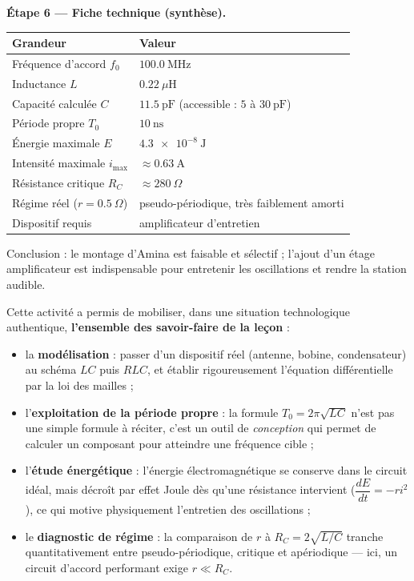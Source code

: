\documentclass[11pt]{article}
\newcounter{popsec}
\newcounter{popsub}
\newcommand{\courssub}[1]{%
  \stepcounter{popsub}%
  \par\vspace{9pt}\noindent{\popxbold\fontsize{11.5}{13}\selectfont\color{popink}{\color{poporange}\thepopsec.\thepopsub}\hspace{6pt}#1}\par\nopagebreak\vspace{4pt}
}
\begin{document}
\begin{exoresolu}
\textbf{Étape 6 — Fiche technique (synthèse).}

\begin{center}
\begin{tabularx}{\linewidth}{|l|X|}\hline
\rowcolor{popblueL} \textbf{Grandeur} & \textbf{Valeur} \\ \hline
Fréquence d'accord $f_0$ & $\num{100,0}~\text{MHz}$ \\ \hline
Inductance $L$ & $\num{0,22}~\mu\text{H}$ \\ \hline
Capacité calculée $C$ & $\num{11,5}~\text{pF}$ (accessible : $5$ à $30~\text{pF}$) \\ \hline
Période propre $T_0$ & $\num{10}~\text{ns}$ \\ \hline
Énergie maximale $E$ & $\num{4,3e-8}~\text{J}$ \\ \hline
Intensité maximale $i_{\max}$ & $\approx \num{0,63}~\text{A}$ \\ \hline
Résistance critique $R_C$ & $\approx \num{280}~\Omega$ \\ \hline
Régime réel ($r = \num{0,5}~\Omega$) & pseudo-périodique, très faiblement amorti \\ \hline
Dispositif requis & amplificateur d'entretien \\ \hline
\end{tabularx}
\end{center}

Conclusion : le montage d'Amina est faisable et sélectif ; l'ajout d'un étage amplificateur est indispensable pour entretenir les oscillations et rendre la station audible.
\end{exoresolu}

\courssub{Bilan de l'activité}

Cette activité a permis de mobiliser, dans une situation technologique authentique, \textbf{l'ensemble des savoir-faire de la leçon} :
\begin{itemize}
\item la \textbf{modélisation} : passer d'un dispositif réel (antenne, bobine, condensateur) au schéma $LC$ puis $RLC$, et établir rigoureusement l'équation différentielle par la loi des mailles ;
\item l'\textbf{exploitation de la période propre} : la formule $T_0 = 2\pi\sqrt{LC}$ n'est pas une simple formule à réciter, c'est un outil de \emph{conception} qui permet de calculer un composant pour atteindre une fréquence cible ;
\item l'\textbf{étude énergétique} : l'énergie électromagnétique se conserve dans le circuit idéal, mais décroît par effet Joule dès qu'une résistance intervient ($\dfrac{dE}{dt} = -ri^2$), ce qui motive physiquement l'entretien des oscillations ;
\item le \textbf{diagnostic de régime} : la comparaison de $r$ à $R_C = 2\sqrt{L/C}$ tranche quantitativement entre pseudo-périodique, critique et apériodique — ici, un circuit d'accord performant exige $r \ll R_C$.
\end{itemize}
\end{document}
